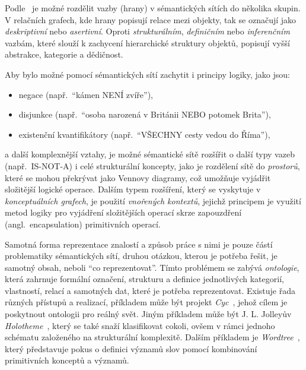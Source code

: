 Podle~\cite{semantic-nets-LEHMANN19921} je možné rozdělit vazby (hrany) v sémantických sítích do několika skupin.
V relačních grafech, kde hrany popisují relace mezi objekty, tak se označují jako \emph{deskriptivní} nebo \emph{asertivní}.
Oproti \emph{strukturálním}, \emph{definičním} nebo \emph{inferenčním} vazbám, které slouží k zachycení hierarchické struktury objektů,
popisují vyšší abstrakce, kategorie a dědičnost.~\cite{semantic-nets-LEHMANN19921}

Aby bylo možné pomocí sémantických sítí zachytit i principy logiky, jako jsou:
\begin{itemize}
	\item negace (např.~\enquote{kámen NENÍ zvíře}),
	\item disjunkce (např.~\enquote{osoba narozená v Británii NEBO potomek Brita}),
	\item existenční kvantifikátory (např.~\enquote{VŠECHNY cesty vedou do Říma}),
\end{itemize}
a další komplexnější vztahy, je možné sémantické sítě rozšířit o další typy vazeb (např.~IS-NOT-A) i celé strukturální koncepty,
jako je rozdělení sítě do \emph{prostorů}, které se mohou překrývat jako Vennovy diagramy, což umožňuje vyjádřit složitější logické operace.
Dalším typem rozšíření, který se vyskytuje v \emph{konceptuálních grafech}, je použití \emph{vnořených kontextů},
jejichž principem je využití metod logiky pro vyjádření složitějších operací skrze zapouzdření (angl.~encapsulation) primitivních operací.
~\cite{semantic-nets-LEHMANN19921}

Samotná forma reprezentace znalostí a způsob práce s nimi je pouze částí problematiky sémantických sítí,
druhou otázkou, kterou je potřeba řešit, je samotný obsah, neboli \enquote{co reprezentovat}.
Tímto problémem se zabývá \emph{ontologie}, která zahrnuje formální označení, strukturu a definice jednotlivých kategorií,
vlastností, relací a samotných dat, které je potřeba reprezentovat.
Existuje řada různých přístupů a realizací, příkladem může být projekt \emph{Cyc}~\cite{cyc}, jehož cílem je poskytnout ontologii pro reálný svět.
Jiným příkladem může být J. L. Jolleyův \emph{Holotheme}~\cite{jolley1971holotheme}, který se také snaží klasifikovat cokoli,
ovšem v rámci jednoho schématu založeného na strukturální komplexitě.
Dalším příkladem je \emph{Wordtree}~\cite{burger1984wordtree}, který představuje pokus o definici významů slov pomocí kombinování primitivních konceptů a významů.~\cite{semantic-nets-LEHMANN19921}
